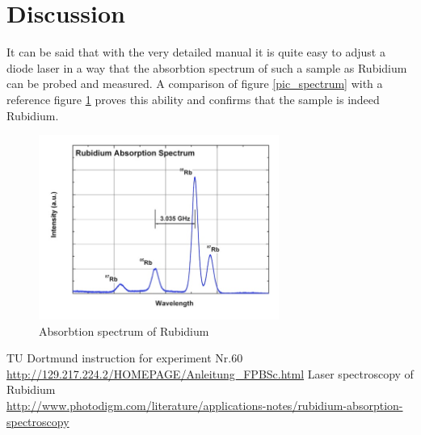 \section{Discussion}
It can be said that with the very detailed manual it is quite easy to adjust a diode laser in a way that the absorbtion spectrum of such a sample as 
Rubidium can be probed and measured. A comparison of figure \ref{pic_spectrum} with a reference figure \ref{pic_ref} proves this ability and confirms that
the sample is indeed Rubidium.
\begin{figure}[H]
 \includegraphics[width=0.7\textwidth]{../pics/reference.jpg}
 \caption{Absorbtion spectrum of Rubidium \cite{ref}}
 \label{pic_ref}
\end{figure}


 \begin{thebibliography}{WissOnl}
 	 TU Dortmund instruction for experiment Nr.60 \url{http://129.217.224.2/HOMEPAGE/Anleitung_FPBSc.html}
 	 Laser spectroscopy of Rubidium \\ \url{http://www.photodigm.com/literature/applications-notes/rubidium-absorption-spectroscopy}
 \end{thebibliography}




